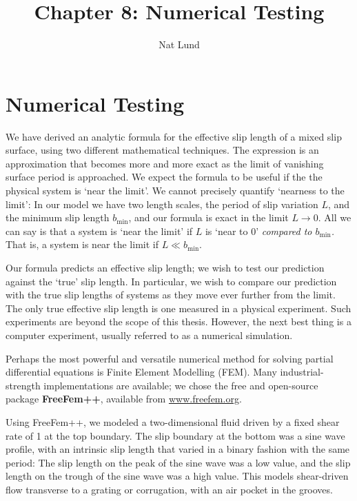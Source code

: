 \documentclass[12pt, a4paper, twoside, openright]{book}
\title{Chapter 8: Numerical Testing}
\author{Nat Lund}
\newcommand{\bmin}{\ensuremath{b_{\mathrm{min}}}}
\begin{document}
\chapter{Numerical Testing}

We have derived an analytic formula for the effective slip length of a mixed slip surface, using two different mathematical techniques.  The expression is an approximation that becomes more and more exact as the limit of vanishing surface period is approached.  We expect the formula to be useful if the the physical system is `near the limit'.
We cannot precisely quantify `nearness to the limit': In our model we have two length scales, the period of slip variation $L$, and the minimum slip length $\bmin$, and our formula is exact in the limit $L \to 0$.  All we can say is that a system is `near the limit' if $L$ is `near to 0' \emph{compared to $\bmin$.} That is, a system is near the limit if $L \ll \bmin$.

Our formula predicts an effective slip length; we wish to test our prediction against the `true' slip length. In particular, we wish to compare our prediction with the true slip lengths of systems as they move ever further from the limit.  The only true effective slip length is one measured in a physical experiment.  Such experiments are beyond the scope of this thesis.  However, the next best thing is a computer experiment, usually referred to as a numerical simulation.

Perhaps the most powerful and versatile numerical method for solving partial differential equations is Finite Element Modelling (FEM).  Many industrial-strength implementations are available; we chose the free and open-source package \textbf{FreeFem++}, available from \url{www.freefem.org}.

Using FreeFem++, we modeled a two-dimensional fluid driven by a fixed shear rate of 1 at the top boundary.  The slip boundary at the bottom was a sine wave profile, with an intrinsic slip length that varied in a binary fashion with the same period: The slip length on the peak of the sine wave was a low value, and the slip length on the trough of the sine wave was a high value.  This models shear-driven flow transverse to a grating or corrugation, with an air pocket in the grooves. 
\end{document}
